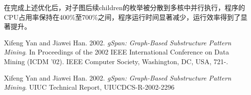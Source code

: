 \documentclass{article}
\begin{document}
在完成上述优化后，对子图后续children的枚举被分散到多核中并行执行，程序的CPU占用率保持在400\%至700\%之间，程序运行时间显著减少，运行效率得到了显著提升。


\begin{thebibliography}{9}

  Xifeng Yan and Jiawei Han. 2002. \emph{gSpan: Graph-Based Substructure Pattern Mining}. In Proceedings of the 2002 IEEE International Conference on Data Mining (ICDM '02). IEEE Computer Society, Washington, DC, USA, 721-.


  Xifeng Yan and Jiawei Han. 2002. \emph{gSpan: Graph-Based Substructure Pattern Mining}. UIUC Technical Report, UIUCDCS-R-2002-2296

\end{thebibliography}
\end{document}
